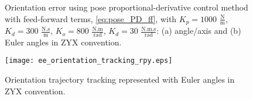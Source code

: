 \begin{figure}
    \centering
    \hfill
    \caption{Orientation error using pose proportional-derivative control method with feed-forward terms, \eqref{eq:pose_PD_ff}, with  ${K_{p}}=1000$ $\mathrm{\frac{N}{m}}$, $K_{d}= 300$ $\mathrm{\frac{N.s}{m}}$, ${K_{o}}=800$ $\mathrm{\frac{N.m}{rad}}$, $K_{d}= 30$ $\mathrm{\frac{N.m.s}{rad}}$: (a) angle/axis and (b) Euler angles in ZYX convention.}
    \label{fig:act_3.6_ee_orientation_error}
\end{figure}

\begin{figure}
	\centering
	\texttt{[image: ee\_orientation\_tracking\_rpy.eps]}
    \caption{Orientation trajectory tracking represented with Euler angles in ZYX convention.}
    \label{fig:act_3.6_ee_orientation_tracking_rpy}	
\end{figure}

